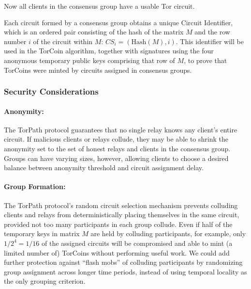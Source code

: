 Now all clients in the consensus group have a usable Tor circuit.



Each circuit formed by a consensus group obtains a unique Circuit Identifier,
which is an ordered pair consisting of the hash of the matrix $M$ and the
row number $i$ of the circuit within $M$: $CS_i = (\mathrm{Hash}(M), i)$. This
identifier will be used in the TorCoin algorithm,
together with signatures using the four anonymous temporary public keys
comprising that row of $M$,
to prove that TorCoins were
minted by circuits assigned in consensus groups.

\subsubsection{Security Considerations} 

\paragraph{Anonymity:} The TorPath protocol guarantees that no single
relay knows any client's entire circuit. If malicious
clients or relays collude, they may be able to shrink the anonymity set to
the set of honest relays and clients in the consensus group. 
Groups can have varying sizes, however,
allowing clients to choose a desired balance
between anonymity threshold and circuit assignment delay.

\paragraph{Group Formation:}
The TorPath protocol's random circuit selection mechanism prevents
colluding clients and relays from deterministically placing themselves
in the same circuit,
provided not too many participants in each group collude.
Even if half of the temporary keys in matrix $M$
are held by colluding participants, for example,
only $1/2^4 = 1/16$ of the assigned circuits
will be compromised and able to mint (a limited number of)
TorCoins without performing useful work.
We could add further protection
against ``flash mobs'' of colluding participants
by randomizing group assignment across longer time periods,
instead of using temporal locality as the only grouping criterion.

